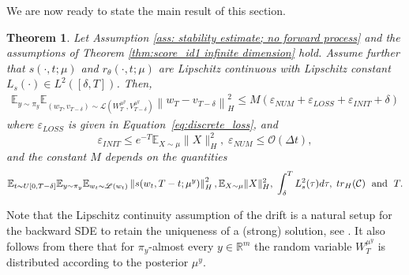 \documentclass[10pt]{article} %
\def\Eqref#1{Equation~\ref{#1}}
\newcommand{\E}{\mathbb{E}}
\newcommand{\R}{\mathbb{R}}
\theoremstyle{plain}
\newtheorem{theorem}{Theorem}[section]
\theoremstyle{definition}
\theoremstyle{remark}
\renewcommand{\L}{\mathscr{L}}
\newcommand{\tr}{{\rm tr}}
\newcommand{\norm}[1]{\left\|#1\right\|}
\newcommand{\C}{\mathcal C}
\newcommand{\low}[1]{{\lfloor #1 \rfloor}}
\begin{document}
We are now ready to state the main result of this section.
\begin{theorem}\label{thm: stability estimate}
Let Assumption \ref{ass: stability estimate; no forward process} and the assumptions of Theorem \ref{thm:score_id1 infinite dimension} hold. Assume further that $s(\cdot,t;\mu)$ and $r_\theta(\cdot,t;\mu)$ are Lipschitz continuous with Lipschitz constant $L_s(\cdot) \in L^2([\delta,T])$. %
Then, %
\begin{eqnarray*}
    \E_{y \sim \pi_y} \E_{(w_T, v_{T-\delta}) \sim \L( W_T^{\mu^y},V_{T-\delta}^{\mu^y})} {\norm{w_T -  v_{T-\delta}}_H^2} 
    \le M\left( \varepsilon_{NUM} + \varepsilon_{LOSS} + \varepsilon_{INIT} + \delta \right)
\end{eqnarray*}
where $\varepsilon_{LOSS}$ is given in \Eqref{eq:discrete_loss}, and 
\begin{equation*}
    \varepsilon_{INIT} \le e^{-T} \E_{X\sim\mu}\|X\|_H^2, \;
    \varepsilon_{NUM} \le {\mathcal O}(\Delta t),
\end{equation*}
and the constant $M$ depends on the quantities
\begin{eqnarray*}
    \E_{t\sim U[0,T-\delta]}\E_{y \sim \pi_y}\E_{w_t \sim \L(w_t)} \norm{s(w_t, T-t; \mu^y)}_H^2,  \E_{X\sim\mu}\|X\|_H^2, \; \int_\delta^{T} L_s^2(\tau) d \tau, \; \tr_H (\C)\; \text{ and } \; T.
\end{eqnarray*}
\end{theorem}
Note that the Lipschitz continuity assumption of the drift is a natural setup for the backward SDE to retain the uniqueness of a (strong) solution, see \citet{pidstrigach2023infinitedimensional}. It also follows from there that for $\pi_y$-almost every $y \in \R^m$ the random variable $W_T^{\mu^y}$ is distributed according to the posterior $\mu^y$.
\end{document}
